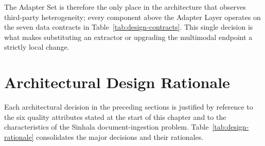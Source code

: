 \documentclass[12pt,a4paper,oneside]{report}
\begin{document}
The Adapter Set is therefore the only place in the architecture that observes third-party heterogeneity; every component above the Adapter Layer operates on the seven data contracts in Table~\ref{tab:design-contracts}. This single decision is what makes substituting an extractor or upgrading the multimodal endpoint a strictly local change.

\section{Architectural Design Rationale}
\label{sec:design-rationale}
Each architectural decision in the preceding sections is justified by reference to the six quality attributes stated at the start of this chapter and to the characteristics of the Sinhala document-ingestion problem. Table~\ref{tab:design-rationale} consolidates the major decisions and their rationales.
\end{document}
